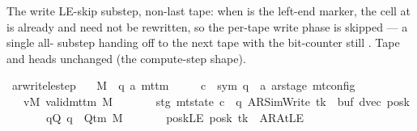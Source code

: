 \begin{isabellebody}
%
\isadelimproof
%
\endisadelimproof
%
\begin{isamarkuptext}%
The write LE-skip substep, non-last tape: when 
  is the left-end marker, the cell at  is already
   and need not be rewritten, so the per-tape write phase is
  skipped — a single all- substep handing off to the next tape
   with the bit-counter still .  Tape and
  heads unchanged (the compute-step shape).%
\end{isamarkuptext}\isamarkuptrue%
\isamarkupfalse%
\ ar{\isacharunderscore}{\kern0pt}write{\isacharunderscore}{\kern0pt}le{\isacharunderscore}{\kern0pt}step{\isacharcolon}{\kern0pt}\isanewline
\ \ \ M\ {\isacharcolon}{\kern0pt}{\isacharcolon}{\kern0pt}\ {\isachardoublequoteopen}{\isacharparenleft}{\kern0pt}{\isacharprime}{\kern0pt}q{\isacharcomma}{\kern0pt}\ {\isacharprime}{\kern0pt}a{\isacharparenright}{\kern0pt}\ mttm{\isachardoublequoteclose}\isanewline
\ \ \ \ \ c{\isacharprime}{\kern0pt}\ {\isacharcolon}{\kern0pt}{\isacharcolon}{\kern0pt}\ {\isachardoublequoteopen}{\isacharparenleft}{\kern0pt}sym{}{\isacharcomma}{\kern0pt}\ {\isacharprime}{\kern0pt}q\ {\isasymtimes}\ {\isacharprime}{\kern0pt}a\ ar{\isacharunderscore}{\kern0pt}stage{\isacharparenright}{\kern0pt}\ mt{\isacharunderscore}{\kern0pt}config{\isachardoublequoteclose}\isanewline
\ \ \ vM{\isacharcolon}{\kern0pt}\ {\isachardoublequoteopen}valid{\isacharunderscore}{\kern0pt}mttm\ M{\isachardoublequoteclose}\isanewline
\ \ \ \ \ \ \ stg{\isacharcolon}{\kern0pt}\ {\isachardoublequoteopen}mt{\isacharunderscore}{\kern0pt}state\ c{\isacharprime}{\kern0pt}\ {\isacharequal}{\kern0pt}\ {\isacharparenleft}{\kern0pt}q{\isacharcomma}{\kern0pt}\ AR{\isacharunderscore}{\kern0pt}SimWrite{\isacharcomma}{\kern0pt}\ tk{\isacharcomma}{\kern0pt}\ {}{\isacharcomma}{\kern0pt}\ buf{\isacharcomma}{\kern0pt}\ dvec{\isacharcomma}{\kern0pt}\ posk{\isacharparenright}{\kern0pt}{\isachardoublequoteclose}\isanewline
\ \ \ \ \ \ \ qQ{\isacharcolon}{\kern0pt}\ {\isachardoublequoteopen}q\ {\isasymin}\ Q{\isacharunderscore}{\kern0pt}tm\ M{\isachardoublequoteclose}\isanewline
\ \ \ \ \ \ \ poskLE{\isacharcolon}{\kern0pt}\ {\isachardoublequoteopen}posk\ tk\ {\isacharequal}{\kern0pt}\ AR{\isacharunderscore}{\kern0pt}AtLE{\isachardoublequoteclose}\isanewline

\end{isabellebody}
